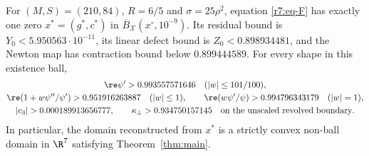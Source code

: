 \begin{theorem}\label{r7:thm-zero}
For $(M,S)=(210,84)$, $R=6/5$ and $\sigma=25\rho^2$, equation \eqref{r7:eq-F} has exactly one zero $x^*=(g^*,c^*)$ in $\overline B_{\mathcal X}(x^\circ,10^{-9})$. Its residual bound is $Y_0<5.950563\cdot10^{-11}$, its linear defect bound is $Z_0<0.898934481$, and the Newton map has contraction bound below $0.899444589$. For every shape in this existence ball,
\begin{gather*}
\re\psi'>0.993557571646\quad(|w|\leq101/100),\\
\re(1+w\psi''/\psi')>0.951916263887\quad(|w|\leq1),\qquad
\re(w\psi'/\psi)>0.994796343179\quad(|w|=1),\\
|c_3|>0.000189913656777,\qquad
\kappa_\perp>0.934750157145\quad\text{on the unscaled revolved boundary}.
\end{gather*}
In particular, the domain reconstructed from $x^*$ is a strictly convex non-ball domain in $\R^7$ satisfying Theorem~\ref{thm:main}.
\end{theorem}
